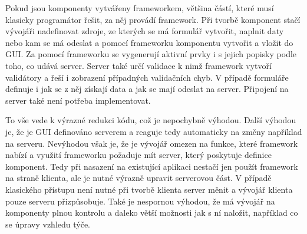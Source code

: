 Pokud jsou komponenty vytvářeny frameworkem, většina částí, které musí klasicky programátor řešit, za něj provádí framework. Při tvorbě komponent stačí vývojáři nadefinovat zdroje, ze kterých se má formulář vytvořit, naplnit daty nebo kam se má odeslat a pomocí frameworku komponentu vytvořit a vložit do GUI. Za pomocí frameworku se vygenerují aktivní prvky i s jejich popisky podle toho, co udává server. Server také určí validace k nimž framework vytvoří validátory a řeší i zobrazení případných validačních chyb. V případě formuláře definuje i jak se z něj získají data a jak se mají odeslat na server. Připojení na server také není potřeba implementovat. 

To vše vede k výrazné redukci kódu, což je nepochybně výhodou. Další výhodou je, že je GUI definováno serverem a reaguje tedy automaticky na změny například na serveru. Nevýhodou však je, že je vývojář omezen na funkce, které framework nabízí a využití frameworku požaduje mít server, který poskytuje definice komponent. Tedy při nasazení na existující aplikaci nestačí jen použít framework na straně klienta, ale je nutné výrazně upravit serverovou část. V případě klasického přístupu není nutné při tvorbě klienta server měnit a vývojář klienta pouze serveru přizpůsobuje. Také je nespornou výhodou, že má vývojář na komponenty plnou kontrolu a daleko větší možnosti jak s ní naložit, například co se úpravy vzhledu týče.
  